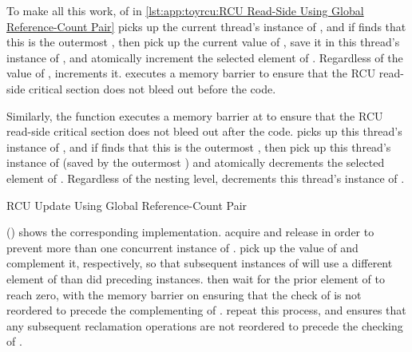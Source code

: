 \begin{fcvref}
To make all this work,  of  in
\cref{lst:app:toyrcu:RCU Read-Side Using Global Reference-Count Pair}
picks up the
current thread's instance of , and if  finds
that this is the outermost ,
then  pick up the current value of
, save it in this thread's instance of ,
and atomically increment the selected element of .
Regardless of the value of ,  increments it.
 executes a memory barrier to ensure that the RCU read-side
critical section does not bleed out before the  code.
\end{fcvref}

\begin{fcvref}
Similarly, the  function executes a memory barrier
at 
to ensure that the RCU read-side critical section does not bleed out
after the  code.
 picks up this thread's instance of , and if
 finds that this is the outermost ,
then  pick up this thread's instance of 
(saved by the outermost ) and atomically decrements
the selected element of .
Regardless of the nesting level,  decrements this thread's
instance of .
\end{fcvref}

\begin{listing}

\caption{RCU Update Using Global Reference-Count Pair}
\label{lst:app:toyrcu:RCU Update Using Global Reference-Count Pair}
\end{listing}

\begin{fcvref}
()
shows the corresponding  implementation.
 acquire and release  in order to
prevent more than one concurrent instance of .
 pick up the value of  and complement it,
respectively, so that subsequent instances of 
will use a different element of  than did preceding
instances.
then wait for the prior element of  to
reach zero, with the memory barrier on  ensuring that the check
of  is not reordered to precede the complementing of
.
 repeat this process, and
 ensures that any
subsequent reclamation operations are not reordered to precede the
checking of .
\end{fcvref}

